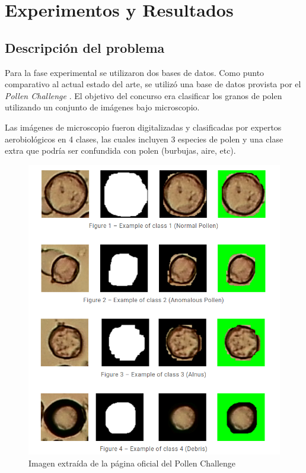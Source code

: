 
\chapter{Experimentos y Resultados} \label{experimentos}
\section{Descripción del problema}
Para la fase experimental se utilizaron dos bases de datos. Como punto comparativo al actual estado del arte, se utilizó 
una base de datos provista por el \textsl{Pollen Challenge} \cite{polen}. El objetivo del concurso era clasificar los granos de polen utilizando un  conjunto de imágenes bajo microscopio.

Las imágenes de microscopio fueron digitalizadas y clasificadas por expertos aerobiológicos en 4 clases, las cuales incluyen 3 especies de polen y una clase extra que podría ser confundida con polen (burbujas, aire, etc). 
\begin{figure}[H]
    \centering
    \includegraphics[width = 5in]{../cap5_experimentos/src/polen.png}
    \caption{Imagen extraída de la página oficial del Pollen Challenge \cite{polen}}
\end{figure}
